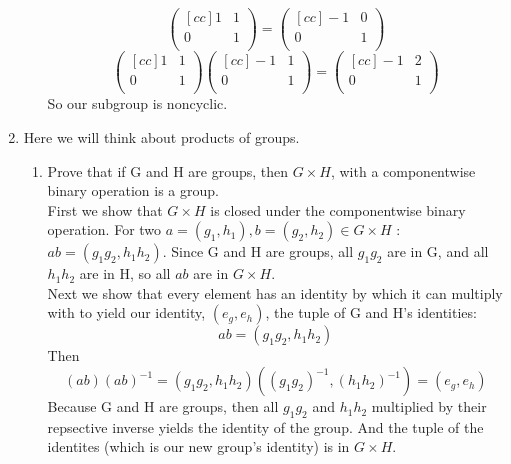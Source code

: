 \begin{enumerate}
\begin{enumerate}
$$      \begin{pmatrix}[cc]
        1 & 1 \\
        0 & 1 \\
      \end{pmatrix}
  = 
      \begin{pmatrix}[cc]
        -1 & 0 \\
        0  & 1 \\
      \end{pmatrix}
$$
$$
      \begin{pmatrix}[cc]
        1 & 1 \\
        0 & 1 \\
      \end{pmatrix}
      \begin{pmatrix}[cc]
        -1 & 1 \\
         0 & 1 \\
      \end{pmatrix}
  = 
      \begin{pmatrix}[cc]
        -1 & 2 \\
        0  & 1 \\
      \end{pmatrix}
$$
So our subgroup is noncyclic.
\end{enumerate}
\item Here we will think about products of groups.
\begin{enumerate}
\item Prove that if G and H are groups, then $G \times H$, with a componentwise binary operation is a group.\\

First we show that $G \times H$ is closed under the componentwise binary operation. For two $a = (g_1,h_1),b = (g_2,h_2) \in G \times H$ : $ab = (g_1g_2,h_1h_2)$. Since G and H are groups, all $g_1g_2$ are in G, and all $h_1h_2$ are in H, so all $ab$ are in $G \times H$.\\

Next we show that every element has an identity by which it can multiply with to yield our identity, $(e_g,e_h)$, the tuple of G and H's identities:
$$ab = (g_1g_2,h_1h_2)$$
Then 
$$(ab)(ab)^{-1} = (g_1g_2,h_1h_2)((g_1g_2)^{-1},(h_1h_2)^{-1}) = (e_g,e_h)$$
Because G and H are groups, then all $g_1g_2$ and $h_1h_2$ multiplied by their repsective inverse yields the identity of the group. And the tuple of the identites (which is our new group's identity) is in $G \times H$.\\


\end{enumerate}
\end{enumerate}
